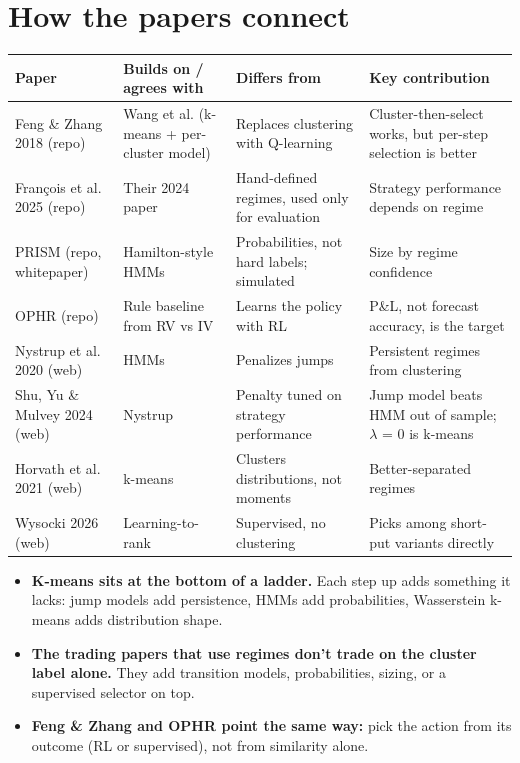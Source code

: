 \documentclass{article}
\begin{document}
\section{How the papers connect}

\begin{center}\small
\begin{tabularx}{\linewidth}{>{\raggedright\arraybackslash}X >{\raggedright\arraybackslash}X >{\raggedright\arraybackslash}X >{\raggedright\arraybackslash}X}
\toprule
\textbf{Paper} & \textbf{Builds on /\allowbreak{} agrees with} & \textbf{Differs from} & \textbf{Key contribution} \\
\midrule
Feng \& Zhang 2018 (repo) & Wang et al. (k-means + per-cluster model) & Replaces clustering with Q-learning & Cluster-then-select works, but per-step selection is better \\
François et al. 2025 (repo) & Their 2024 paper & Hand-defined regimes, used only for evaluation & Strategy performance depends on regime \\
PRISM (repo, whitepaper) & Hamilton-style HMMs & Probabilities, not hard labels; simulated & Size by regime confidence \\
OPHR (repo) & Rule baseline from RV vs IV & Learns the policy with RL & P\&L, not forecast accuracy, is the target \\
Nystrup et al. 2020 (web) & HMMs & Penalizes jumps & Persistent regimes from clustering \\
Shu, Yu \& Mulvey 2024 (web) & Nystrup & Penalty tuned on strategy performance & Jump model beats HMM out of sample; \ensuremath{\lambda} = 0 is k-means \\
Horvath et al. 2021 (web) & k-means & Clusters distributions, not moments & Better-separated regimes \\
Wysocki 2026 (web) & Learning-to-rank & Supervised, no clustering & Picks among short-put variants directly \\
\bottomrule
\end{tabularx}
\end{center}

\begin{itemize}

\item \textbf{K-means sits at the bottom of a ladder.} Each step up adds something it lacks: jump models add persistence, HMMs add probabilities, Wasserstein k-means adds distribution shape.

\item \textbf{The trading papers that use regimes don't trade on the cluster label alone.} They add transition models, probabilities, sizing, or a supervised selector on top.

\item \textbf{Feng \& Zhang and OPHR point the same way:} pick the action from its outcome (RL or supervised), not from similarity alone.

\end{itemize}
\end{document}
